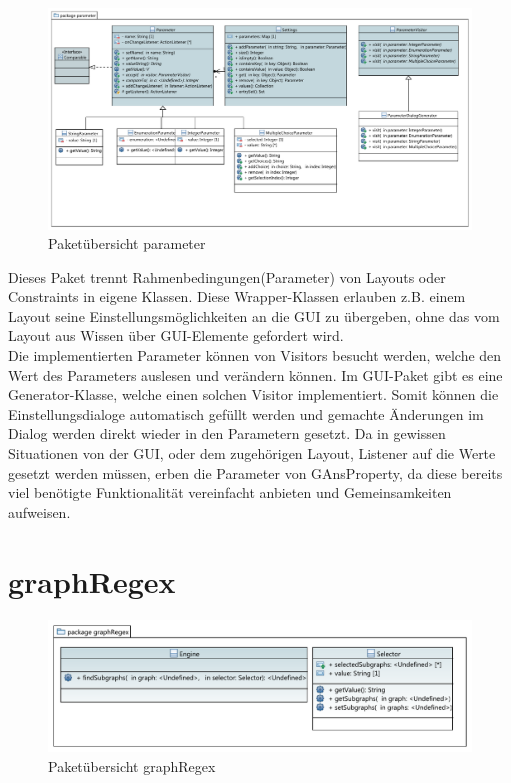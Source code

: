 \begin{figure}[hb]
  \centering
  \includegraphics[width=380pt]{resourcen/parameter.pdf}
  \caption{Paketübersicht parameter}
  \label{fig:packge_parameter}
\end{figure}

Dieses Paket trennt Rahmenbedingungen(Parameter) von Layouts oder Constraints in eigene Klassen. Diese Wrapper-Klassen erlauben z.B. einem Layout seine Einstellungsmöglichkeiten an die GUI zu übergeben, ohne das vom Layout aus Wissen über GUI-Elemente gefordert wird. \\Die implementierten Parameter können von Visitors besucht werden, welche den Wert des Parameters auslesen und verändern können. Im GUI-Paket gibt es eine Generator-Klasse, welche einen solchen Visitor implementiert. Somit können die Einstellungsdialoge automatisch gefüllt werden und gemachte Änderungen im Dialog werden direkt wieder in den Parametern gesetzt. Da in gewissen Situationen von der GUI, oder dem zugehörigen Layout, Listener auf die Werte gesetzt werden müssen, erben die Parameter von GAnsProperty, da diese bereits viel benötigte Funktionalität vereinfacht anbieten und Gemeinsamkeiten aufweisen.

\newpage

\section{graphRegex}

\begin{figure}[hb]
  \centering
  \includegraphics[width=380pt]{resourcen/graphRegex.pdf}
  \caption{Paketübersicht graphRegex}
  \label{fig:packge_graphRegex}
\end{figure}

